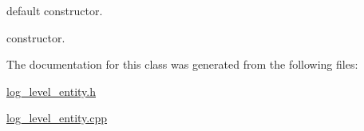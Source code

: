 default constructor. 

constructor. 

The documentation for this class was generated from the following files\-:\begin{DoxyCompactItemize}
\item 
\hyperlink{log__level__entity_8h}{log\-\_\-level\-\_\-entity.\-h}\item 
\hyperlink{log__level__entity_8cpp}{log\-\_\-level\-\_\-entity.\-cpp}\end{DoxyCompactItemize}
